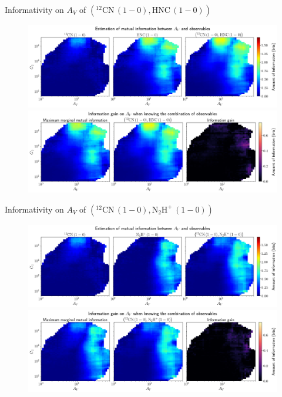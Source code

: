 \documentclass{beamer}
\begin{document}
\begin{frame}{Informativity on $A_V$ of $\left(\mathrm{^{12}CN\,(1-0)},\mathrm{HNC\,(1-0)}\right)$}
    \begin{figure}
        \centering
        \includegraphics[width=0.95\linewidth]{../mi/av__12cn10_hnc10_mi.png}
        \vfill
        \includegraphics[width=0.95\linewidth]{../mi/av__12cn10_hnc10_mi_gain.png}
    \end{figure}
\end{frame}

\begin{frame}{Informativity on $A_V$ of $\left(\mathrm{^{12}CN\,(1-0)},\mathrm{N_2H^+\,(1-0)}\right)$}
    \begin{figure}
        \centering
        \includegraphics[width=0.95\linewidth]{../mi/av__12cn10_n2hp10_mi.png}
        \vfill
        \includegraphics[width=0.95\linewidth]{../mi/av__12cn10_n2hp10_mi_gain.png}
    \end{figure}
\end{frame}
\end{document}
